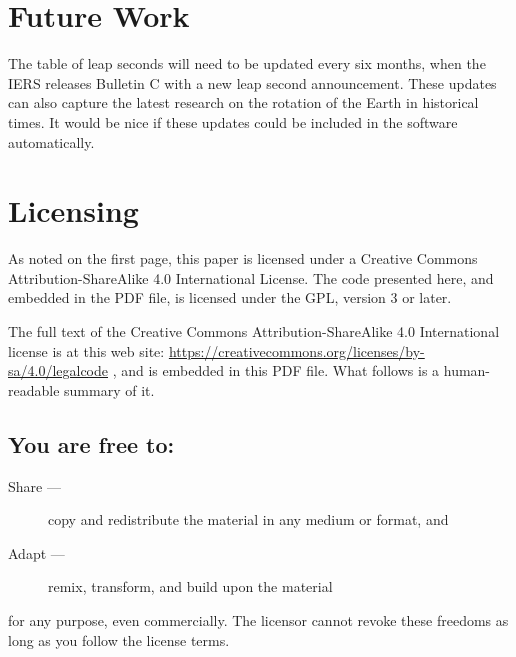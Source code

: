 \documentclass[letterpaper,twoside]{article}
\begin{document}
\section{Future Work}
The table of leap seconds will need to be updated every six months,
when the IERS releases Bulletin C with a new leap second announcement.
These updates can also capture the latest research on the rotation
of the Earth in historical times.  It would be nice if these updates
could be included in the software automatically.

\section{Licensing}
\label{section:Licensing}
As noted on the first page, this paper is licensed under a Creative
Commons Attribution-ShareAlike 4.0 International License.  The code
presented here, and embedded in the PDF file, is licensed under
the GPL, version 3 or later.

The full text of the Creative Commons Attribution-ShareAlike 4.0
International license is at this web site:
\href{https://creativecommons.org/licenses/by-sa/4.0/legalcode}{https://creativecommons.org/licenses/by-sa/4.0/legalcode}%
, and is embedded in this
PDF file.  What follows is a human-readable summary of it.

\subsection{You are free to:}
\begin{description}
\item[Share ---]copy and redistribute the material in any medium or format, and
\item[Adapt ---]remix, transform, and build upon the material
\end{description}
for any purpose, even commercially.  The licensor cannot revoke these
freedoms as long as you follow the license terms.
\end{document}
